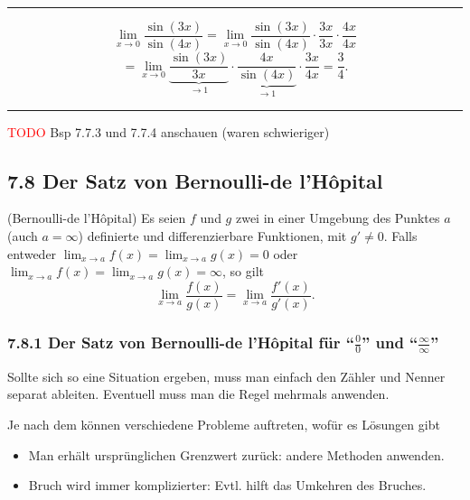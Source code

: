 \documentclass[a4paper,landscape,8pt]{extarticle}
\newcommand{\todo}{\textcolor{red}{TODO }}
\newcommand{\sep}{\vspace{5pt}\noindent\hrule\vspace{5pt}}
\begin{document}
\begin{multicols*}{4}
\sep

\Bsp
\[
\lim_{x\to 0} \frac{\sin(3x)}{\sin(4x)}
=
\lim_{x\to 0} \frac{\sin(3x)}{\sin(4x)} \cdot \frac{3x}{3x} \cdot \frac{4x}{4x}
\]
\[
= \lim_{x\to 0} \underbrace{\frac{\sin(3x)}{3x}}_{\to 1} \cdot
\underbrace{\frac{4x}{\sin(4x)}}_{\to 1}
\cdot
\frac{3x}{4x} = \frac{3}{4}.
\]

\sep

\begin{warmup}
\Bsp

\todo Bsp 7.7.3 und 7.7.4 anschauen (waren schwieriger)
\end{warmup}


\subsection{7.8 Der Satz von Bernoulli-de l'Hôpital}

\Satz (Bernoulli-de l'Hôpital) Es seien $f$ und $g$ zwei in einer Umgebung des
Punktes $a$ (auch $a=\infty$) definierte und differenzierbare Funktionen, mit
$g'\neq 0$. Falls entweder $\lim_{x\to a} f(x) = \lim_{x\to a} g(x) = 0$ oder
$\lim_{x\to a} f(x) = \lim_{x\to a} g(x) = \infty$, so gilt
\[
\lim_{x\to a} \frac{f(x)}{g(x)} = \lim_{x\to a} \frac{f'(x)}{g'(x)}.
\]

\subsubsection{7.8.1 Der Satz von Bernoulli-de l'Hôpital für ``$\frac{0}{0}$''
und ``$\frac{\infty}{\infty}$''}

Sollte sich so eine Situation ergeben, muss man einfach den Zähler und Nenner
separat ableiten. Eventuell muss man die Regel mehrmals anwenden.

Je nach dem können verschiedene Probleme auftreten, wofür es Lösungen gibt
\begin{itemize}
  \item Man erhält ursprünglichen Grenzwert zurück: andere Methoden
  anwenden.
  \item Bruch wird immer komplizierter: Evtl. hilft das Umkehren des Bruches.
\end{itemize}


\end{multicols*}
\end{document}
